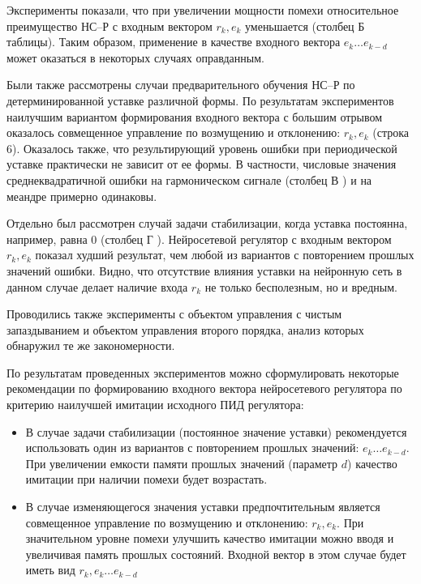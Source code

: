 Эксперименты показали, что при увеличении мощности помехи
относительное преимущество НС--Р с входным вектором $r_k,e_k$
уменьшается (столбец {\sf Б} таблицы).  Таким образом, применение в
качестве входного вектора $e_k\ldots e_{k-d}$ может оказаться в
некоторых случаях оправданным.

Были также рассмотрены случаи предварительного обучения НС--Р по
детерминированной уставке различной формы.  По результатам
экспериментов наилучшим вариантом формирования входного вектора с
большим отрывом оказалось совмещенное управление по возмущению и
отклонению: $r_k,e_k$ (строка 6).  Оказалось также, что результирующий
уровень ошибки при периодической уставке практически не зависит от ее
формы.  В частности, числовые значения среднеквадратичной ошибки на
гармоническом сигнале (столбец {\sf В}
) и на меандре примерно одинаковы.

Отдельно был рассмотрен случай задачи стабилизации, когда уставка
постоянна, например, равна 0 (столбец {\sf Г}
).  Нейросетевой регулятор с
входным вектором $r_k,e_k$ показал худший результат, чем любой из
вариантов с повторением прошлых значений ошибки.  Видно, что
отсутствие влияния уставки на нейронную сеть в данном случае делает
наличие входа $r_k$ не только бесполезным, но и вредным.

Проводились также эксперименты с объектом управления с чистым
запаздыванием и объектом управления второго порядка, анализ которых
обнаружил те же закономерности.

По результатам проведенных экспериментов можно сформулировать
некоторые рекомендации по формированию входного вектора нейросетевого
регулятора по критерию наилучшей имитации исходного ПИД регулятора:

\begin{itemize}
\item
В случае задачи стабилизации (постоянное значение уставки)
рекомендуется использовать один из вариантов с повторением прошлых
значений: $e_k\ldots e_{k-d}$.  При увеличении емкости памяти прошлых
значений (параметр $d$) качество имитации при наличии помехи будет
возрастать.

\item
В случае изменяющегося значения уставки предпочтительным является
совмещенное управление по возмущению и отклонению: $r_k,e_k$.  При
значительном уровне помехи улучшить качество имитации можно вводя и
увеличивая память прошлых состояний.  Входной вектор в этом случае
будет иметь вид $r_k,e_k\ldots e_{k-d}$
\end{itemize}


